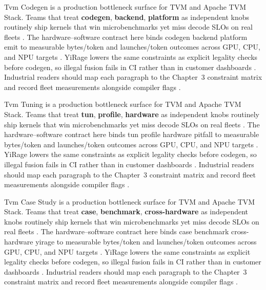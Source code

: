 Tvm Codegen is a production bottleneck surface for TVM and Apache TVM Stack. Teams that treat \textbf{codegen}, \textbf{backend}, \textbf{platform} as independent knobs routinely ship kernels that win microbenchmarks yet miss decode SLOs on real fleets \citep{dlbook,nvidia2024cudagraphs}. The hardware--software contract here binds codegen backend platform emit to measurable bytes/token and launches/token outcomes across GPU, CPU, and NPU targets \citep{dao2022flashattention,liu2024deepseekv3}. YiRage lowers the same constraints as explicit legality checks before codegen, so illegal fusion fails in CI rather than in customer dashboards \citep{kwon2023vllm,patel2025llminference}. Industrial readers should map each paragraph to the Chapter~3 constraint matrix and record fleet measurements alongside compiler flags \citep{nvidia2024cudagraphs,taxbreak2026}.

Tvm Tuning is a production bottleneck surface for TVM and Apache TVM Stack. Teams that treat \textbf{tun}, \textbf{profile}, \textbf{hardware} as independent knobs routinely ship kernels that win microbenchmarks yet miss decode SLOs on real fleets \citep{dao2022flashattention,liu2024deepseekv3}. The hardware--software contract here binds tun profile hardware pitfall to measurable bytes/token and launches/token outcomes across GPU, CPU, and NPU targets \citep{kwon2023vllm,patel2025llminference}. YiRage lowers the same constraints as explicit legality checks before codegen, so illegal fusion fails in CI rather than in customer dashboards \citep{nvidia2024cudagraphs,taxbreak2026}. Industrial readers should map each paragraph to the Chapter~3 constraint matrix and record fleet measurements alongside compiler flags \citep{liu2024deepseekv3,memoryfloor2026}.

Tvm Case Study is a production bottleneck surface for TVM and Apache TVM Stack. Teams that treat \textbf{case}, \textbf{benchmark}, \textbf{cross-hardware} as independent knobs routinely ship kernels that win microbenchmarks yet miss decode SLOs on real fleets \citep{kwon2023vllm,patel2025llminference}. The hardware--software contract here binds case benchmark cross-hardware yirage to measurable bytes/token and launches/token outcomes across GPU, CPU, and NPU targets \citep{nvidia2024cudagraphs,taxbreak2026}. YiRage lowers the same constraints as explicit legality checks before codegen, so illegal fusion fails in CI rather than in customer dashboards \citep{liu2024deepseekv3,memoryfloor2026}. Industrial readers should map each paragraph to the Chapter~3 constraint matrix and record fleet measurements alongside compiler flags \citep{patel2025llminference,nvidia2022hopper}.

